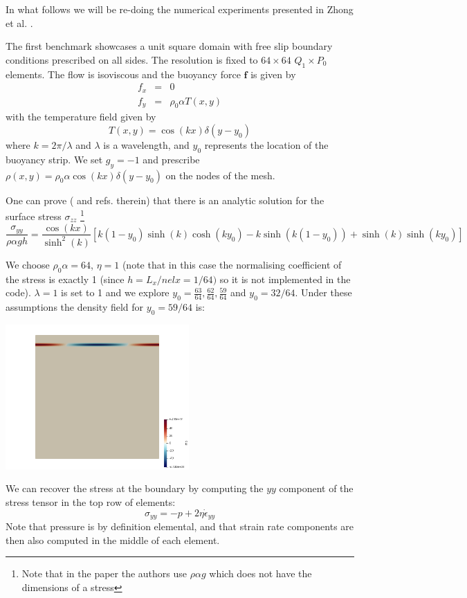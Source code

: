 In what follows we will be re-doing the numerical experiments presented in 
Zhong et al. \cite{zhgh93}.

The first benchmark showcases a unit square domain with free slip 
boundary conditions prescribed on all sides.
The resolution is fixed to $64\times64$ $Q_1 \times P_0$ elements. 
The flow is isoviscous and the buoyancy force ${\bm f}$ is given by 
\begin{eqnarray}
f_x &=& 0 \nonumber\\
f_y &=& \rho_0 \alpha T(x,y) \nonumber
\end{eqnarray}
with the temperature field given by 
\[
T(x,y) = \cos(kx) \delta(y-y_0)
\]
where $k=2\pi/\lambda$ and $\lambda$ is a wavelength, 
and $y_0$ represents the location of the buoyancy strip.
We set $g_y=-1$ and prescribe $\rho(x,y)=\rho_0 \alpha \cos(kx) \delta(y-y_0)$ on the nodes
of the mesh.

One can prove (\cite{zhgh93} and refs. therein) that 
there is an analytic solution for the surface stress $\sigma_{zz}$
\footnote{Note that in the paper the authors use $\rho \alpha g$ which does not have the 
dimensions of a stress}
\[
\frac{\sigma_{yy}}{\rho \alpha g h} =
\frac{\cos (kx)}{\sinh^2(k)}
\left[
k(1-y_0)\sinh(k) \cosh(ky_0)-k \sinh(k(1-y_0))
+\sinh(k) \sinh(ky_0)
\right]
\]

We choose $\rho_0 \alpha = 64$, $\eta=1$ (note that in this case the 
normalising coefficient of the stress is exactly 1 (since $h=L_x/nelx=1/64)$ so it is not implemented in the code).
$\lambda=1$ is set to 1 and we explore $y_0 = \frac{63}{64},\frac{62}{64},\frac{59}{64}$ and $y_0=32/64$.
Under these assumptions the density field for $y_0=59/64$ is:
\begin{center}
\includegraphics[width=7cm]{python_codes/fieldstone_27/rho}
\end{center}

We can recover the stress at the boundary by computing 
the $yy$ component of the stress tensor in the top row of elements: 
\[
\sigma_{yy} = -p + 2 \eta \dot{\epsilon}_{yy}
\]
Note that pressure is by definition elemental, and that strain rate
components are then also computed in the middle of each element.

